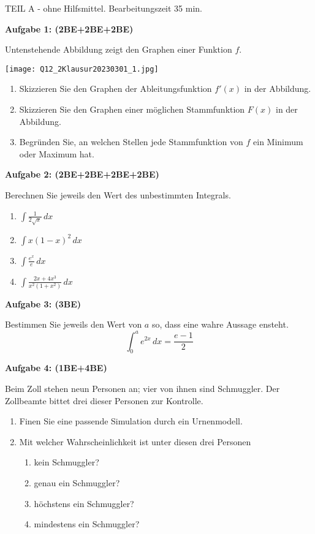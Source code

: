 \documentclass[a4paper,12pt]{article}
\newcommand{\Aufgabe}[1]{
  {
  \vspace*{0.5cm}
  \textsf{\textbf{Aufgabe #1}}
  \vspace*{0.2cm}
  
  }
}
\begin{document}
\vspace{0.3cm}

\newpage
\vspace{1,5cm} {TEIL A} - ohne Hilfsmittel. Bearbeitungszeit 35 min.
\vspace {0,2cm}

\Aufgabe{1: (2BE+2BE+2BE)}

Untenstehende Abbildung zeigt den Graphen einer Funktion $f$.
\begin{center}
\texttt{[image: Q12\_2Klausur20230301\_1.jpg]}
\end{center}
\begin{enumerate}[label={\alph*)}]
  \item Skizzieren Sie den Graphen der Ableitungsfunktion $f'(x)$ in der Abbildung.
  \item Skizzieren Sie den Graphen einer möglichen Stammfunktion $F(x)$ in der Abbildung.
  \item Begründen Sie, an welchen Stellen jede Stammfunktion von $f$ ein Minimum oder Maximum hat.
\end{enumerate}

\Aufgabe{2: (2BE+2BE+2BE+2BE)}
Berechnen Sie jeweils den Wert des unbestimmten Integrals.

\begin{enumerate}[label={\alph*)}]
  \item $\int \frac{1}{2\sqrt{x}}\, dx$
  \item $\int x(1-x)^2\, dx$
  \item $\int \frac{e^x}{e}\, dx$
  \item $\int \frac{2x+4x^3}{x^2(1+x^2)}\, dx$
\end{enumerate}

\Aufgabe{3: (3BE)}
Bestimmen Sie jeweils den Wert von $a$ so, dass eine wahre Aussage ensteht.
\[ \int_0^a e^{2x}\, dx = \frac{e-1}{2} \]

\newpage
\Aufgabe{4: (1BE+4BE)}
Beim Zoll stehen neun Personen an; vier von ihnen sind Schmuggler. Der Zollbeamte bittet drei dieser Personen zur Kontrolle.
  \begin{enumerate}[label={\alph*)}]
    \item Finen Sie eine passende Simulation durch ein Urnenmodell.
    \item Mit welcher Wahrscheinlichkeit ist unter diesen drei Personen
      \begin{enumerate}[label={(\arabic*)}]
        \item kein Schmuggler?
        \item genau ein Schmuggler?
        \item höchstens ein Schmuggler?
        \item mindestens ein Schmuggler?
      \end{enumerate}
  \end{enumerate}
\end{document}
